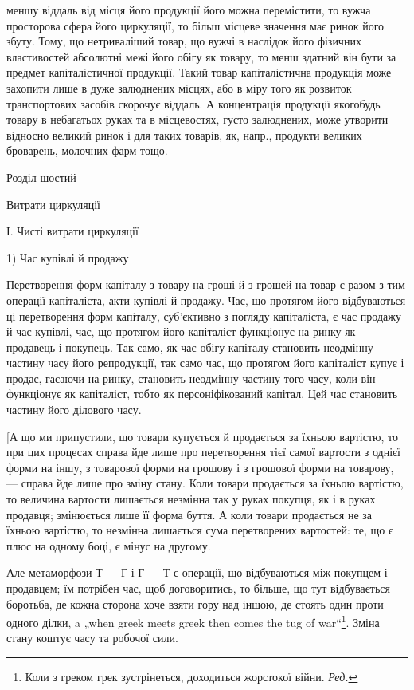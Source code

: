 \parcont{}  %
меншу віддаль від місця його продукції його можна перемістити, то
вужча просторова сфера його циркуляції, то більш місцеве значення має
ринок його збуту. Тому, що нетриваліший товар, що вужчі в наслідок
його фізичних властивостей абсолютні межі його обігу як товару, то
менш здатний він бути за предмет капіталістичної продукції. Такий
товар капіталістична продукція може захопити лише в дуже залюднених
місцях, або в міру того як розвиток транспортових засобів скорочує
віддаль. А концентрація продукції якогобудь товару в небагатьох руках
та в місцевостях, густо залюднених, може утворити відносно великий ринок
і для таких товарів, як, напр., продукти великих броварень, молочних
фарм тощо.

Розділ шостий

Витрати циркуляції

І. Чисті витрати циркуляції

1) Час купівлі й продажу

Перетворення форм капіталу з товару на гроші й з грошей на
товар є разом з тим операції капіталіста, акти купівлі й продажу. Час,
що протягом його відбуваються ці перетворення форм капіталу, суб’єктивно
з погляду капіталіста, є час продажу й час купівлі, час, що протягом
його капіталіст функціонує на ринку як продавець і покупець. Так само,
як час обігу капіталу становить неодмінну частину часу його репродукції,
так само час, що протягом його капіталіст купує і продає, гасаючи на
ринку, становить неодмінну частину того часу, коли він функціонує як
капіталіст, тобто як персоніфікований капітал. Цей час становить частину
його ділового часу.

[А що ми припустили, що товари купується й продається за їхньою
вартістю, то при цих процесах справа йде лише про перетворення тієї
самої вартости з однієї форми на іншу, з товарової форми на грошову
і з грошової форми на товарову, — справа йде лише про зміну стану.
Коли товари продається за їхньою вартістю, то величина вартости
лишається незмінна так у руках покупця, як і в руках продавця; змінюється
лише її форма буття. А коли товари продається не за їхньою вартістю,
то незмінна лишається сума перетворених вартостей: те, що є плюс на
одному боці, є мінус на другому.

Але метаморфози Т — Г і Г — Т є операції, що відбуваються між
покупцем і продавцем; їм потрібен час, щоб договоритись, то більше,
що тут відбувається боротьба, де кожна сторона хоче взяти гору над
іншою, де стоять один проти одного ділки, a „when greek meets greek
then comes the tug of war“\footnote*{
Коли з греком грек зустрінеться, доходиться жорстокої війни. \emph{Ред.}
}. Зміна стану коштує часу та робочої сили.
\parbreak{}  %
